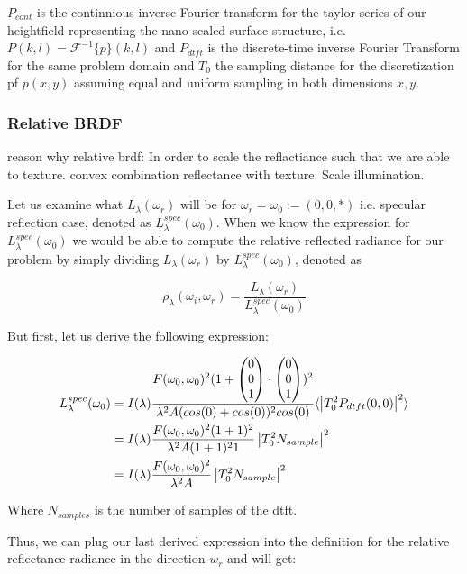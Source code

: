 $P_{cont}$ is the continnious inverse Fourier transform for the taylor series of our heightfield representing the nano-scaled surface structure, i.e. $P(k,l) = \mathcal{F}^{-1}\{p\}(k,l)$ and $P_{dtft}$ is the discrete-time inverse Fourier Transform for the same problem domain and $T_0$ the sampling distance for the discretization pf $p(x,y)$ assuming equal and uniform sampling in both dimensions $x,y$.


\subsubsection{Relative BRDF}
reason why relative brdf: In order to scale the reflactiance such that we are able to texture. 
convex combination reflectance with texture. Scale illumination.

Let us examine what $L_\lambda(\omega_r)$ will be for $\omega_r = \omega_0 := (0,0,*)$ i.e. specular reflection case, denoted as $L_\lambda^{spec}(\omega_0)$. 
When we know the expression for $L_\lambda^{spec}(\omega_0)$ we would be able to compute the relative reflected radiance for our problem by simply dividing $L_\lambda(\omega_r)$ by $L_\lambda^{spec}(\omega_0)$, denoted as 

\begin{equation}
    \rho_\lambda(\omega_i,\omega_r) = \frac{L_\lambda(\omega_r)}{L_\lambda^{spec}(\omega_0)}
\end{equation}

But first, let us derive the following expression:

\begin{align*}
L_\lambda^{spec}(\omega_0) 
& = I(\lambda) \frac{F(\omega_0, \omega_0)^2 (1+\colvec[0]{0}{1}\cdot\colvec[0]{0}{1})^2}{\lambda^2 A (cos(0)+cos(0))^2 cos(0)} \langle \left|T_0^2 P_{dtft}(0,0)  \right|^2\rangle \\
& = I(\lambda) \frac{F(\omega_0, \omega_0)^2 (1+1)^2}{\lambda^2 A (1+1)^2 1}\left| T_0^2 N_{sample} \right|^2 \\
& = I(\lambda) \frac{F(\omega_0, \omega_0)^2}{\lambda^2 A}\left| T_0^2 N_{sample} \right|^2 
\end{align*}

Where $N_{samples}$ is the number of samples of the dtft.

Thus, we can plug our last derived expression into the definition for the relative reflectance radiance in the direction $w_r$ and will get:

